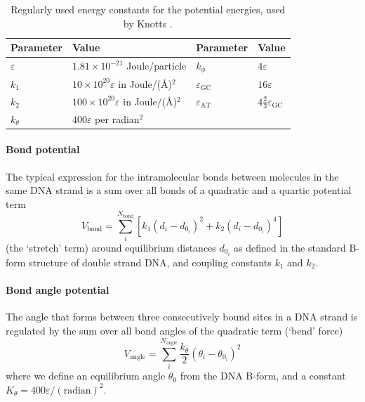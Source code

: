 \begin{table}[hbt]\begin{center}
\begin{tabular}{llll}
Parameter & Value \qquad \qquad \qquad \qquad & Parameter & Value\\
\hline
$\varepsilon$ & $1.81\times10^{-21}$ Joule/particle\qquad\qquad & $k_\phi$ & $4\varepsilon$ \\
$k_1$ & $10\times10^{20}\varepsilon$ in Joule/(\AA)$^2$ & $\varepsilon_\text{GC}$ & $16\varepsilon$\\

$k_2$ & $100\times10^{20}\varepsilon$ in Joule/(\AA)$^2$ & $\varepsilon_\text{AT}$ & $4\frac{2}{3} \varepsilon_\text{GC}$ \\
$k_\theta$ & $400\varepsilon$ per radian$^2$ & & \\
\end{tabular}
\caption{Regularly used energy constants for the potential energies, used by Knotts \etal \cite{knotts2007coarse}.}\end{center}
\end{table}

\paragraph{Bond potential} The typical expression for the intramolecular bonds between molecules in the same DNA strand is a sum over all bonds of a quadratic and a quartic potential term
\begin{equation}
V_{\text{bond}} = \sum_i^{N_{\text{bond}}} \left[ k_1 \left(d_i - d_{0_i}\right)^2 + k_2 \left(d_i - d_{0_i}\right)^4\right]
\end{equation}
(the `stretch' term) around equilibrium distances $d_{0_i}$ as defined in the standard B-form structure of double strand DNA, and coupling constants $k_1$ and $k_2$.

\paragraph{Bond angle potential} The angle that forms between three consecutively bound sites in a DNA strand is regulated by the sum over all bond angles of the quadratic term (`bend' force)
\begin{equation}
V_\text{angle} =  \sum_i^{N_\text{angle}} \frac{k_\theta}{2} \left( \theta_i - \theta_{0_i} \right)^2
\end{equation}
where we define an equilibrium angle $\theta_0$ from the DNA B-form, and a constant $K_\theta = 400\varepsilon / (\text{radian})^ 2$.

